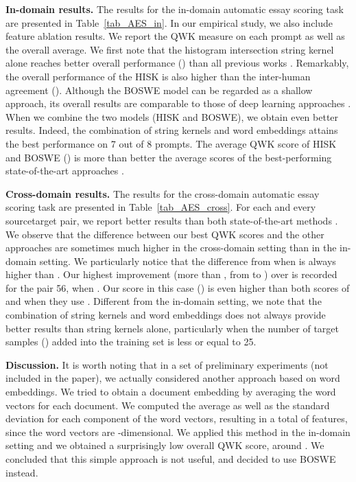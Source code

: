\documentclass[11pt,a4paper]{article}
\begin{document}
\noindent
{\bf In-domain results.}
The results for the in-domain automatic essay scoring task are presented in Table~\ref{tab_AES_in}. In our empirical study, we also include feature ablation results. We report the QWK measure on each prompt as well as the overall average. We first note that the histogram intersection string kernel alone reaches better overall performance () than all previous works \cite{Phandi-EMNLP-2015,Dong-EMNLP-2016,Dong-CONLL-2017,Tay-ACL-2018}. Remarkably, the overall performance of the HISK is also higher than the inter-human agreement (). Although the BOSWE model can be regarded as a shallow approach, its overall results are comparable to those of deep learning approaches \cite{Dong-EMNLP-2016,Dong-CONLL-2017,Tay-ACL-2018}. When we combine the two models (HISK and BOSWE), we obtain even better results. Indeed, the combination of string kernels and word embeddings attains the best performance on 7 out of 8 prompts. The average QWK score of HISK and BOSWE () is more than  better the average scores of the best-performing state-of-the-art approaches \cite{Dong-CONLL-2017,Tay-ACL-2018}.

\noindent
{\bf Cross-domain results.} The results for the cross-domain automatic essay scoring task are presented in Table~\ref{tab_AES_cross}. For each and every sourcetarget pair, we report better results than both state-of-the-art methods \cite{Phandi-EMNLP-2015,Dong-EMNLP-2016}. We observe that the difference between our best QWK scores and the other approaches are sometimes much higher in the cross-domain setting than in the in-domain setting. We particularly notice that the difference from \cite{Phandi-EMNLP-2015} when  is always higher than . Our highest improvement (more than , from  to ) over \cite{Phandi-EMNLP-2015} is recorded for the pair 56, when . Our score in this case () is even higher than both scores of  and  when they use . Different from the in-domain setting, we note that the combination of string kernels and word embeddings does not always provide better results than string kernels alone, particularly when the number of target samples () added into the training set is less or equal to 25.

\noindent
{\bf Discussion.} It is worth noting that in a set of preliminary experiments (not included in the paper), we actually considered another approach based on word embeddings. We tried to obtain a document embedding by averaging the word vectors for each document. We computed the average as well as the standard deviation for each component of the word vectors, resulting in a total of  features, since the word vectors are -dimensional. We applied this method in the in-domain setting and we obtained a surprisingly low overall QWK score, around . We concluded that this simple approach is not useful, and decided to use BOSWE \cite{Ionescu-KES-2017} instead.
\end{document}
